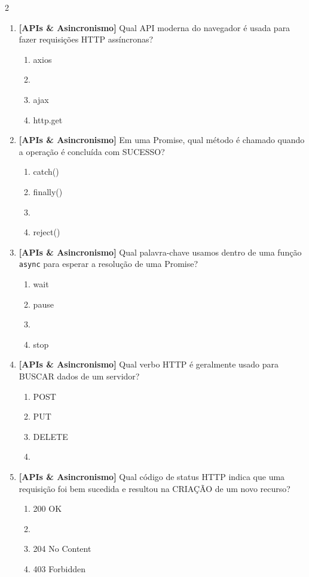 \documentclass[a4paper,10pt]{article}
\begin{document}
\begin{multicols*}{2}
\begin{enumerate}[label=\textbf{\arabic*.}, resume, leftmargin=*]
\item \textbf{[APIs \& Asincronismo]} Qual API moderna do navegador é usada para fazer requisições HTTP assíncronas?
\begin{enumerate}[label=(\alph*), noitemsep]
  \item axios
  \item {}
  \item ajax
  \item http.get
\end{enumerate}

\item \textbf{[APIs \& Asincronismo]} Em uma Promise, qual método é chamado quando a operação é concluída com SUCESSO?
\begin{enumerate}[label=(\alph*), noitemsep]
  \item catch()
  \item finally()
  \item {}
  \item reject()
\end{enumerate}

\item \textbf{[APIs \& Asincronismo]} Qual palavra-chave usamos dentro de uma função \texttt{async} para esperar a resolução de uma Promise?
\begin{enumerate}[label=(\alph*), noitemsep]
  \item wait
  \item pause
  \item {}
  \item stop
\end{enumerate}

\item \textbf{[APIs \& Asincronismo]} Qual verbo HTTP é geralmente usado para BUSCAR dados de um servidor?
\begin{enumerate}[label=(\alph*), noitemsep]
  \item POST
  \item PUT
  \item DELETE
  \item {}
\end{enumerate}

\item \textbf{[APIs \& Asincronismo]} Qual código de status HTTP indica que uma requisição foi bem sucedida e resultou na CRIAÇÃO de um novo recurso?
\begin{enumerate}[label=(\alph*), noitemsep]
  \item 200 OK
  \item {}
  \item 204 No Content
  \item 403 Forbidden
\end{enumerate}


\end{enumerate}
\end{multicols*}
\end{document}
